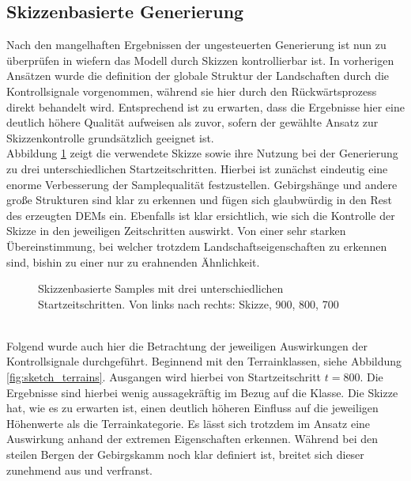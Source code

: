 \subsection {Skizzenbasierte Generierung}

Nach den mangelhaften Ergebnissen der ungesteuerten Generierung ist nun zu überprüfen in wiefern das Modell durch Skizzen kontrollierbar ist. In vorherigen Ansätzen wurde die definition der globale Struktur der Landschaften durch die Kontrollsignale vorgenommen, während sie hier durch den Rückwärtsprozess direkt behandelt wird. Entsprechend ist zu erwarten, dass die Ergebnisse hier eine deutlich höhere Qualität aufweisen als zuvor, sofern der gewählte Ansatz zur Skizzenkontrolle grundsätzlich geeignet ist. \\
Abbildung \ref{fig:sketch_strengths} zeigt die verwendete Skizze sowie ihre Nutzung bei der Generierung zu drei unterschiedlichen Startzeitschritten. Hierbei ist zunächst eindeutig eine enorme Verbesserung der Samplequalität festzustellen. Gebirgshänge und andere große Strukturen sind klar zu erkennen und fügen sich glaubwürdig in den Rest des erzeugten \ac{DEM}s ein. Ebenfalls ist klar ersichtlich, wie sich die Kontrolle der Skizze in den jeweiligen Zeitschritten auswirkt. Von einer sehr starken Übereinstimmung, bei welcher trotzdem Landschaftseigenschaften zu erkennen sind, bishin zu einer nur zu erahnenden Ähnlichkeit.  
\begin{figure}[htbp]
    \centering
    \caption{Skizzenbasierte Samples mit drei unterschiedlichen Startzeitschritten. Von links nach rechts: Skizze, 900, 800, 700}
    \label{fig:sketch_strengths}
\end{figure} \\
Folgend wurde auch hier die Betrachtung der jeweiligen Auswirkungen der Kontrollsignale durchgeführt. Beginnend mit den Terrainklassen, siehe Abbildung \ref{fig:sketch_terrains}. Ausgangen wird hierbei von Startzeitschritt $t=800$. Die Ergebnisse sind hierbei wenig aussagekräftig im Bezug auf die Klasse. Die Skizze hat, wie es zu erwarten ist, einen deutlich höheren Einfluss auf die jeweiligen Höhenwerte als die Terrainkategorie. Es lässt sich trotzdem im Ansatz eine Auswirkung anhand der extremen Eigenschaften erkennen. Während bei den steilen Bergen der Gebirgskamm noch klar definiert ist, breitet sich dieser zunehmend aus und verfranst.  
